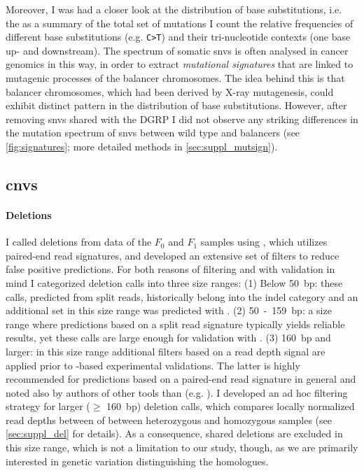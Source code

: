 Moreover, I was had a closer look at the distribution of base
substitutions, i.e. the 
    {as a summary of the total set of
    mutations I count the relative frequencies of different base substitutions
    (e.g. \texttt{C>T}) and their tri-nucleotide contexts (one base up- and
    downstream). The spectrum of somatic \acp{snv} is often analysed in cancer
    genomics in this way, in order to extract \emph{mutational signatures} that
    are linked to mutagenic processes}
of the balancer chromosomes. The idea behind this is that balancer chromosomes,
which had been derived by X-ray mutagenesis, could exhibit distinct pattern in
the distribution of base substitutions. However, after removing \acp{snv}
shared with the DGRP I did not observe any striking differences in the mutation
spectrum of \acp{snv} between wild type and balancers (see
\cref{fig:signatures}; more detailed methods in \cref{sec:suppl_mutsign}).






\subsection{\texorpdfstring{\Aclp{cnv}}{Copy number variants}}
\label{sec:balancer_cnv}

\paragraph{Deletions} I called deletions from \wgs data of the $F_0$ and $F_1$
samples using \delly, which utilizes paired-end read signatures, and developed an
extensive set of filters to reduce false positive predictions. For both reasons
of filtering and with validation in mind I categorized deletion calls into three
size ranges: (1) Below 50~bp: these calls, predicted from split reads,
historically belong into the indel category and an additional set in this size
range was predicted with \freebayes. (2) 50~-~159~bp: a size range where
predictions based on a split read signature typically yields reliable results,
yet these calls are large enough for validation with \pcr.
(3) 160~bp and larger: in this size range additional filters based on a
read depth signal are applied prior to \pcr-based experimental validations.
The latter is highly recommended for \cnv predictions based on a paired-end read
signature in general and noted also by authors of other tools than \delly
(e.g. \cite{Layer2014}). I developed an ad hoc filtering strategy
for larger ($\geq$ 160~bp) deletion calls, which compares locally normalized
read depths between of between heterozygous and homozygous samples (see
\cref{sec:suppl_del} for details). As a consequence, shared deletions are
excluded in this size range, which is not a limitation to our study, though, as
we are primarily interested in genetic variation distinguishing the homologues.

